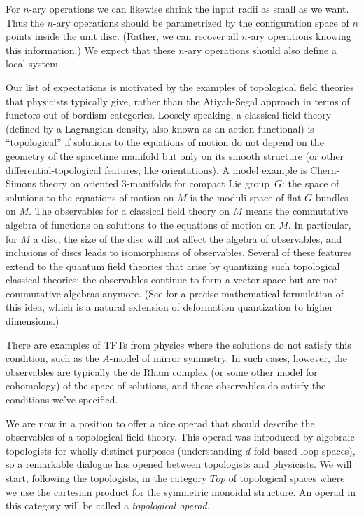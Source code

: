 \documentclass[11pt]{amsart}
\begin{document}
For $n$-ary operations we can likewise shrink the input radii as small as we want.
Thus the $n$-ary operations should be parametrized by the configuration space of $n$ points inside the unit disc.
(Rather, we can recover all $n$-ary operations knowing this information.)
We expect that these $n$-ary operations should also define a local system.

Our list of expectations is motivated by the examples of topological field theories that physicists typically give, rather than the Atiyah-Segal approach in terms of functors out of bordism categories.
Loosely speaking, a classical field theory (defined by a Lagrangian density, also known as an action functional) is ``topological'' if solutions to the equations of motion do not depend on the geometry of the spacetime manifold but only on its smooth structure (or other differential-topological features, like orientations).
A model example is Chern-Simons theory on oriented 3-manifolds for compact Lie group~$G$:
the space of solutions to the equations of motion on $M$ is the moduli space of flat $G$-bundles on $M$.
The observables for a classical field theory on $M$ means the commutative algebra of functions on solutions to the equations of motion on $M$.
In particular, for $M$ a disc, the size of the disc will not affect the algebra of observables,
and inclusions of discs leads to isomorphisms of observables.
Several of these features extend to the quantum field theories that arise by quantizing such topological classical theories;
the observables continue to form a vector space but are not commutative algebras anymore.
(See \cite{CG1, CG2} for a precise mathematical formulation of this idea, which is a natural extension of deformation quantization to higher dimensions.)

\begin{rmk}
There are examples of TFTs from physics where the solutions do not satisfy this condition,
such as the $A$-model of mirror symmetry.
In such cases, however, the observables are typically the de Rham complex (or some other model for cohomology) of the space of solutions,
and these observables do satisfy the conditions we've specified.
\end{rmk}

We are now in a position to offer a nice operad that should describe the observables of a topological field theory.
This operad was introduced by algebraic topologists for wholly distinct purposes (understanding $d$-fold based loop spaces),
so a remarkable dialogue has opened between topologists and physicists.
We will start, following the topologists, in the category $Top$ of topological spaces
where we use the cartesian product for the symmetric monoidal structure.
An operad in this category will be called a {\em topological operad}.
\end{document}
